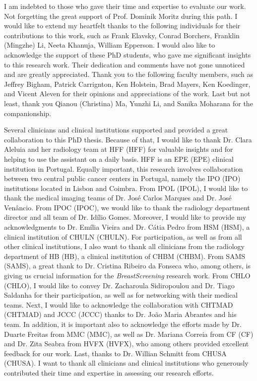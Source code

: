 I am indebted to those who gave their time and expertise to evaluate our work.
Not forgetting the great support of Prof. Dominik Moritz during this path.
I would like to extend my heartfelt thanks to the following individuals for their contributions to this work, such as Frank Elavsky, Conrad Borchers, Franklin (Mingzhe) Li, Neeta Khanuja, William Epperson.
I would also like to acknowledge the support of these \acs{PhD} students, who gave me significant insights to this research work.
Their dedication and comments have not gone unnoticed and are greatly appreciated.
Thank you to the following faculty members, such as Jeffrey Bigham, Patrick Carrignton, Ken Holstein, Brad Mayers, Ken Koedinger, and Vicent Aleven for their opinions and appreciations of the work.
Last but not least, thank you Qianou (Christina) Ma, Yunzhi Li, and Sanika Moharana for the companionship.

Several clinicians and clinical institutions supported and provided a great collaboration to this \acs{PhD} thesis.
Because of that, I would like to thank Dr. Clara Aleluia and her radiology team at \acl{HFF} (\acs{HFF}) for valuable insights and for helping to use the assistant on a daily basis.
\acs{HFF} is an \acl{EPE} (\acs{EPE}) clinical institution in Portugal.
Equally important, this research involves collaboration between two central public cancer centers in Portugal, namely the \acl{IPO} (\acs{IPO}) institutions located in Lisbon and Coimbra.
From \acl{IPOL} (\acs{IPOL}), I would like to thank the medical imaging teams of Dr. Jos\'{e} Carlos Marques and Dr. Jos\'{e} Ven\^{a}ncio.
From \acl{IPOC} (\acs{IPOC}), we would like to thank the radiology department director and all team of Dr. Id\'{i}lio Gomes.
Moreover, I would like to provide my acknowledgments to Dr. Em\'{i}lia Vieira and Dr. C\'{a}tia Pedro from \acl{HSM} (\acs{HSM}), a clinical institution of \acl{CHULN} (\acs{CHULN}).
For participation, as well as from all other clinical institutions, I also want to thank all clinicians from the radiology department of \acl{HB} (\acs{HB}), a clinical institution of \acl{CHBM} (\acs{CHBM}).
From \acl{SAMS} (\acs{SAMS}), a great thank to Dr. Cristina Ribeiro da Fonseca who, among others, is giving us crucial information for the {\it BreastScreening} research work.
From \acl{CHLO} (\acs{CHLO}), I would like to convey Dr. Zacharoula Sidiropoulou and Dr. Tiago Saldanha for their participation, as well as for networking with their medical teams.
Next, I would like to acknowledge the collaboration with \acl{CHTMAD} (\acs{CHTMAD}) and \acl{JCCC} (\acs{JCCC}) thanks to Dr. Jo\~{a}o Maria Abrantes and his team.
In addition, it is important also to acknowledge the efforts made by Dr. Duarte Freitas from \acl{MMC} (\acs{MMC}), as well as Dr. Mariana Correia from \acl{CF} (\acs{CF}) and Dr. Zita Seabra from \acl{HVFX} (\acs{HVFX}), who among others provided excellent feedback for our work.
Last, thanks to Dr. Willian Schmitt from \acl{CHUSA} (\acs{CHUSA}).
I want to thank all clinicians and clinical institutions who generously contributed their time and expertise in assessing our research efforts.